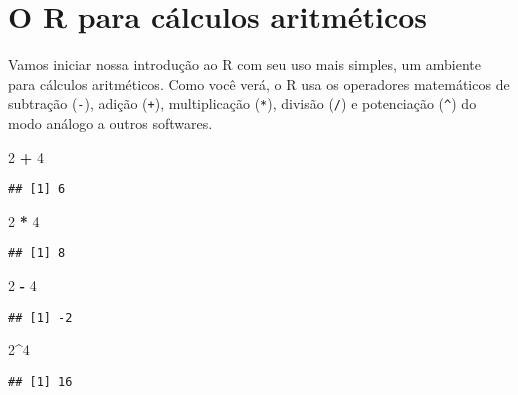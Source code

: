 \documentclass[
]{book}
\newenvironment{Shaded}{\begin{snugshade}}{\end{snugshade}}
\newcommand{\DecValTok}[1]{\textcolor[rgb]{0.00,0.00,0.81}{#1}}
\newcommand{\OperatorTok}[1]{\textcolor[rgb]{0.81,0.36,0.00}{\textbf{#1}}}
\newcommand{\StringTok}[1]{\textcolor[rgb]{0.31,0.60,0.02}{#1}}
\begin{document}
\hypertarget{o-r-para-cuxe1lculos-aritmuxe9ticos}{%
\section{O R para cálculos aritméticos}\label{o-r-para-cuxe1lculos-aritmuxe9ticos}}

Vamos iniciar nossa introdução ao R com seu uso mais simples, um ambiente para cálculos aritméticos. Como você verá, o R usa os operadores matemáticos de subtração (\texttt{-}), adição (\texttt{+}), multiplicação (\texttt{*}), divisão (\texttt{/}) e potenciação (\texttt{\^{}}) do modo análogo a outros softwares.

\begin{Shaded}
\begin{Highlighting}[]
\DecValTok{2} \OperatorTok{+}\StringTok{ }\DecValTok{4}
\end{Highlighting}
\end{Shaded}

\begin{verbatim}
## [1] 6
\end{verbatim}

\begin{Shaded}
\begin{Highlighting}[]
\DecValTok{2} \OperatorTok{*}\StringTok{ }\DecValTok{4}
\end{Highlighting}
\end{Shaded}

\begin{verbatim}
## [1] 8
\end{verbatim}

\begin{Shaded}
\begin{Highlighting}[]
\DecValTok{2} \OperatorTok{-}\StringTok{ }\DecValTok{4}
\end{Highlighting}
\end{Shaded}

\begin{verbatim}
## [1] -2
\end{verbatim}

\begin{Shaded}
\begin{Highlighting}[]
\DecValTok{2}\OperatorTok{^}\DecValTok{4}
\end{Highlighting}
\end{Shaded}

\begin{verbatim}
## [1] 16
\end{verbatim}
\end{document}
